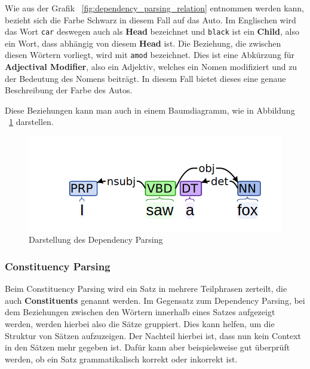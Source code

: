Wie aus der Grafik ~\ref{fig:dependency_parsing_relation} entnommen werden kann, bezieht sich die Farbe Schwarz in diesem Fall auf das Auto.
Im Englischen wird das Wort \texttt{car} deswegen auch als \textbf{Head} bezeichnet und \texttt{black} ist ein \textbf{Child}, also ein Wort, dass abhängig von diesem \textbf{Head} ist.
Die Beziehung, die zwischen diesen Wörtern vorliegt, wird mit \texttt{amod} bezeichnet.
Dies ist eine Abkürzung für \textbf{Adjectival Modifier}, also ein Adjektiv, welches ein Nomen modifiziert und zu der Bedeutung des Nomens beiträgt.
In diesem Fall bietet dieses eine genaue Beschreibung der Farbe des Autos.\cite{dependencyParsing}

Diese Beziehungen kann man auch in einem Baumdiagramm, wie in Abbildung ~\ref{fig:dependency_parsing_tree} darstellen.

\begin{figure}[hbt!]
    \centering
    \includegraphics[scale=0.5]{pics/dependency_parse_tree}
    \caption{Darstellung des Dependency Parsing~\cite{dependencyVsConstituencyParsing}}
    \label{fig:dependency_parsing_tree}
\end{figure}

\subsubsection{Constituency Parsing}\label{subsubsec:constituency-parsing}

Beim Constituency Parsing wird ein Satz in mehrere Teilphrasen zerteilt, die auch \textbf{Constituents} genannt werden.
Im Gegensatz zum Dependency Parsing, bei dem Beziehungen zwischen den Wörtern innerhalb eines Satzes aufgezeigt werden, werden hierbei also die Sätze gruppiert.
Dies kann helfen, um die Struktur von Sätzen aufzuzeigen.
Der Nachteil hierbei ist, dass nun kein Context in den Sätzen mehr gegeben ist.
Dafür kann aber beispielsweise gut überprüft werden, ob ein Satz grammatikalisch korrekt oder inkorrekt ist.\cite{machineLearningTextAnalysis}

